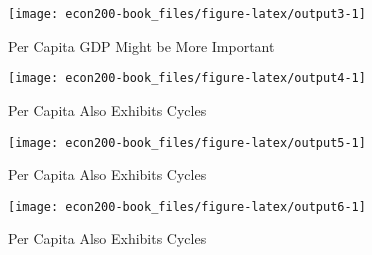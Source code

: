 \documentclass[
]{book}
\begin{document}
\begin{figure}

{\centering \texttt{[image: econ200-book\_files/figure-latex/output3-1]} 

}

\caption{Per Capita GDP Might be More Important}\label{fig:output3}
\end{figure}

\begin{figure}

{\centering \texttt{[image: econ200-book\_files/figure-latex/output4-1]} 

}

\caption{Per Capita Also Exhibits Cycles}\label{fig:output4}
\end{figure}

\begin{figure}

{\centering \texttt{[image: econ200-book\_files/figure-latex/output5-1]} 

}

\caption{Per Capita Also Exhibits Cycles}\label{fig:output5}
\end{figure}

\begin{figure}

{\centering \texttt{[image: econ200-book\_files/figure-latex/output6-1]} 

}

\caption{Per Capita Also Exhibits Cycles}\label{fig:output6}
\end{figure}

  
\end{document}
